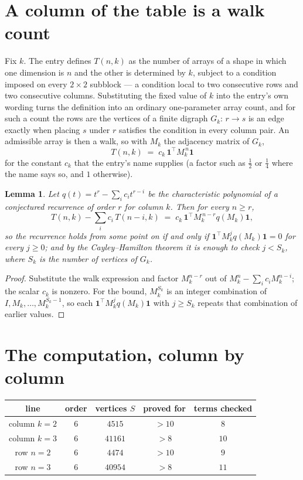 \documentclass[11pt,a4paper]{article}
\theoremstyle{plain}
\newtheorem{lemma}[theorem]{Lemma}
\theoremstyle{definition}
\begin{document}
\section{A column of the table is a walk count}

Fix $k$. The entry defines $T(n,k)$ as the number of arrays of a shape in which one dimension
is $n$ and the other is determined by $k$, subject to a condition imposed on every
$2\times2$ subblock --- a condition local to two consecutive rows and two consecutive columns.
Substituting the fixed value of $k$ into the entry's own wording turns the definition into an
ordinary one-parameter array count, and for such a count the rows are the vertices of a finite
digraph $G_k$: $r\to s$ is an edge exactly when placing $s$ under $r$ satisfies the condition
in every column pair. An admissible array is then a walk, so with $M_k$ the adjacency matrix
of $G_k$,
\[
T(n,k)\;=\;c_k\,\mathbf{1}^{\!\top}M_k^{\,n}\mathbf{1}
\]
for the constant $c_k$ that the entry's name supplies (a factor such as $\tfrac12$ or
$\tfrac14$ where the name says so, and $1$ otherwise).

\begin{lemma}\label{lem:crit}
Let $q(t)=t^{r}-\sum_i c_it^{r-i}$ be the characteristic polynomial of a conjectured
recurrence of order $r$ for column $k$. Then for every $n\ge r$,
\[
T(n,k)-\sum_i c_i\,T(n-i,k)\;=\;c_k\,\mathbf{1}^{\!\top}M_k^{\,n-r}q(M_k)\mathbf{1},
\]
so the recurrence holds from some point on if and only if
$\mathbf{1}^{\!\top}M_k^{j}q(M_k)\mathbf{1}=0$ for every $j\ge0$; and by the
Cayley--Hamilton theorem it is enough to check $j<S_k$, where $S_k$ is the number of vertices
of $G_k$.
\end{lemma}

\begin{proof}
Substitute the walk expression and factor $M_k^{n-r}$ out of $M_k^{n}-\sum_ic_iM_k^{n-i}$;
the scalar $c_k$ is nonzero. For the bound, $M_k^{S_k}$ is an integer combination of
$I,M_k,\dots,M_k^{S_k-1}$, so each $\mathbf{1}^{\!\top}M_k^{j}q(M_k)\mathbf{1}$ with
$j\ge S_k$ repeats that combination of earlier values.
\end{proof}

\section{The computation, column by column}

\begin{center}
\begin{tabular}{ccccc}
line & order & vertices $S$ & proved for & terms checked \\ \hline
column $k$$=2$ & $6$ & $4515$ & $>10$ & $8$ \\
column $k$$=3$ & $6$ & $41161$ & $>8$ & $10$ \\
row $n$$=2$ & $6$ & $4474$ & $>10$ & $9$ \\
row $n$$=3$ & $6$ & $40954$ & $>8$ & $11$ \\
\end{tabular}
\end{center}
\end{document}
